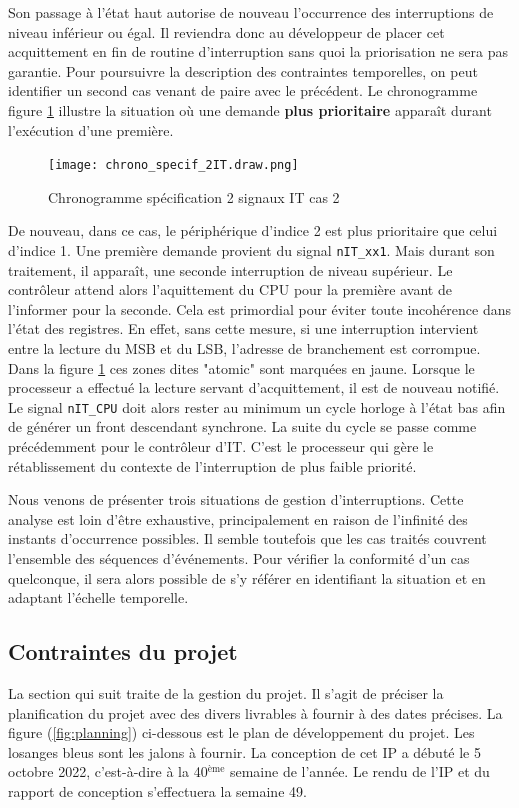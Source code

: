 Son passage à l'état haut autorise de nouveau l'occurrence des interruptions de niveau inférieur ou égal.
Il reviendra donc au développeur de placer cet acquittement en fin de routine d'interruption sans quoi la priorisation ne sera pas garantie.
Pour poursuivre la description des contraintes temporelles, on peut identifier un second cas venant de paire avec le précédent.
Le chronogramme figure \ref{fig:spe_2IT} illustre la situation où une demande \textbf{plus prioritaire} apparaît durant l'exécution d'une première.
\begin{figure}[H]
	\centering
	\texttt{[image: chrono\_specif\_2IT.draw.png]}
	\caption{Chronogramme spécification 2 signaux IT cas 2}
	\label{fig:spe_2IT}
\end{figure}
De nouveau, dans ce cas, le périphérique d'indice 2 est plus prioritaire que celui d'indice 1. 
Une première demande provient du signal \texttt{nIT\_xx1}.
Mais durant son traitement, il apparaît, une seconde interruption de niveau supérieur.
Le contrôleur attend alors l'aquittement du \gls{CPU} pour la première avant de l'informer pour la seconde.
Cela est primordial pour éviter toute incohérence dans l'état des registres.
En effet, sans cette mesure, si une interruption intervient entre la lecture du MSB et du LSB, l'adresse de branchement est corrompue.
Dans la figure \ref{fig:spe_2IT} ces zones dites "atomic" sont marquées en jaune.
Lorsque le processeur a effectué la lecture servant d'acquittement, il est de nouveau notifié.
Le signal \texttt{nIT\_CPU} doit alors rester au minimum un cycle horloge à l'état bas afin de générer un front descendant synchrone.
La suite du cycle se passe comme précédemment pour le contrôleur d'IT.
C'est le processeur qui gère le rétablissement du contexte de l'interruption de plus faible priorité.

\gap
Nous venons de présenter trois situations de gestion d'interruptions. 
Cette analyse est loin d'être exhaustive, principalement en raison de l'infinité des instants d'occurrence possibles.
Il semble toutefois que les cas traités couvrent l'ensemble des séquences d'événements.
Pour vérifier la conformité d'un cas quelconque, il sera alors possible de s'y référer en identifiant la situation et en adaptant l'échelle temporelle.

\subsection{Contraintes du projet}

La section qui suit traite de la gestion du projet.
Il s'agit de préciser la planification du projet avec des divers livrables à fournir à des dates précises.
La figure (\ref{fig:planning}) ci-dessous est le plan de développement du projet.
Les losanges bleus sont les jalons à fournir.
La conception de cet IP a débuté le 5 octobre 2022, c'est-à-dire à la 40$^{\mbox{ème}}$ semaine de l'année.
Le rendu de l'IP et du rapport de conception s'effectuera la semaine 49.

